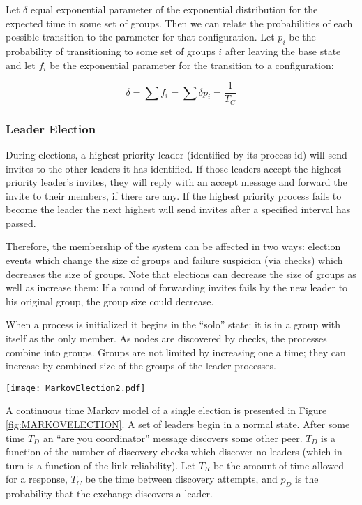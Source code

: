 Let $\delta$ equal exponential parameter of the exponential distribution for the expected time in some
set of groups. Then
we can relate the probabilities of each possible transition to the parameter for that configuration. Let
$p_{i}$ be the probability of transitioning to some set of groups $i$ after leaving the base state and let
$f_{i}$ be the exponential parameter for the transition to a configuration:

\begin{equation}
\delta = \sum f_{i} = \sum \delta p_{i} = \frac{1}{T_{G}}
\end{equation}


\subsubsection{Leader Election}
During elections, a highest priority leader (identified by its process id) will
send invites to the other leaders it has identified. If those leaders accept
the highest priority leader's invites, they will reply with an accept message
and forward the invite to their members, if there are any. If the highest
priority process fails to become the leader the next highest will send invites
after a specified interval has passed.

Therefore, the membership of the system can be affected in two ways: election
events which change the size of groups and failure suspicion (via checks) which
decreases the size of groups. Note that elections can decrease the size of
groups as well as increase them: If a round of forwarding invites fails by the
new leader to his original group, the group size could decrease.

When a process is initialized it begins in the ``solo'' state: it is in a group
with itself as the only member. As nodes are discovered by checks, the
processes combine into groups. Groups are not limited by increasing one a time;
they can increase by combined size of the groups of the leader processes.



\begin{figure*}
\centering
\texttt{[image: MarkovElection2.pdf]}
\caption{A diagram showing a partial Markov chain for an election}
\label{fig:MARKOVELECTION}
\end{figure*}

A continuous time Markov model of a single election is presented in Figure \ref{fig:MARKOVELECTION}.
A set of leaders begin in a normal state. After some time $T_{D}$ an ``are you coordinator''
message discovers some other peer. $T_{D}$ is a function of the number of discovery
checks which discover no leaders (which in turn is a function of the link reliability). Let
$T_{R}$ be the amount of time allowed for a response, $T_{C}$ be the time between
discovery attempts, and $p_{D}$ is the probability that the exchange discovers a leader.

